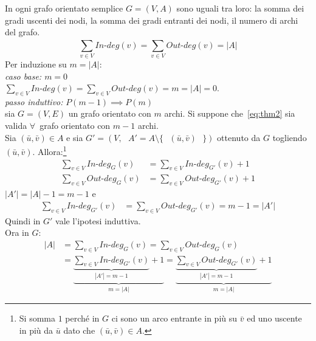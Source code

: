 \begin{thm}
In ogni grafo orientato semplice $G=(V,A)$ sono uguali tra loro: la somma dei gradi
uscenti dei nodi, la somma dei gradi entranti dei nodi, il numero di archi del grafo.
\begin{equation}
{\sum_{v \in V}^{} In\text{-}deg(v)} = {\sum_{v \in V}^{} Out\text{-}deg(v)} = |A|
\label{eq:thm2}
\end{equation}
\proof
    Per induzione su $m = |A|$:\\
    \emph{caso base: $m = 0$}\\ 
    \indent $\sum_{v \in V}^{} In\text{-}deg(v) = \sum_{v \in V}^{} Out\text{-}deg(v) =
    m = |A| = 0$.\\
    \emph{passo induttivo:} $P(m-1) \implies P(m)$\\
    \indent sia $G=(V,E)$ un grafo orientato con $m$ archi. Si suppone che~\ref{eq:thm2} 
    sia valida $\forall$~grafo orientato con $m-1$ archi.\\
    Sia $(\bar{u}, \bar{v}) \in A$ e sia 
    $G'=(V, \text{ } A'=A \setminus \{\text{ } (\bar{u}, \bar{v}) \text{ }\})$ 
    ottenuto da $G$ togliendo $(\bar{u}, \bar{v})$. Allora:\footnote{
        Si somma $1$ perché in $G$ ci sono un arco entrante in più su $\bar{v}$ ed uno
        uscente in più da $\bar{u}$ dato che $(\bar{u},\bar{v}) \in A$.}
    \begin{align*}
        \sum_{v \in V}^{} {In\text{-}deg_{G}(v)} & = \sum_{v \in V}^{} {In\text{-}deg_{G'}(v)} + 1\\
        \sum_{v \in V}^{} Out\text{-}deg_{G}(v) & = \sum_{v \in V}^{} Out\text{-}deg_{G'}(v) + 1
    \end{align*}
    $|A'| = |A| - 1 = m - 1$ e
    \begin{align*}
        \sum_{v \in V}^{} {In\text{-}deg_{G'}(v)} & = \sum_{v \in V}^{} {Out\text{-}deg_{G'}(v)} = 
        m - 1 = |A'|
    \end{align*}
    Quindi in $G'$ vale l'ipotesi induttiva.\\Ora in $G$:
    \begin{equation*}
    \begin{split}
        |A| & = \sum_{v \in V}^{} {In\text{-}deg_{G}(v)} = \sum_{v \in V}^{} {Out\text{-}deg_{G}(v)}\\
    & =\underbrace{\underbrace{\sum_{v \in V}^{} {In\text{-}deg_{G'}(v)}}_{|A'| = m-1}+1}_{m=|A|} =
        \underbrace{\underbrace{\sum_{v \in V}^{} {Out\text{-}deg_{G'}(v)}}_{|A'| = m-1}+1}_{m=|A|}
    \end{split}
    \end{equation*}
\endproof
\end{thm}

